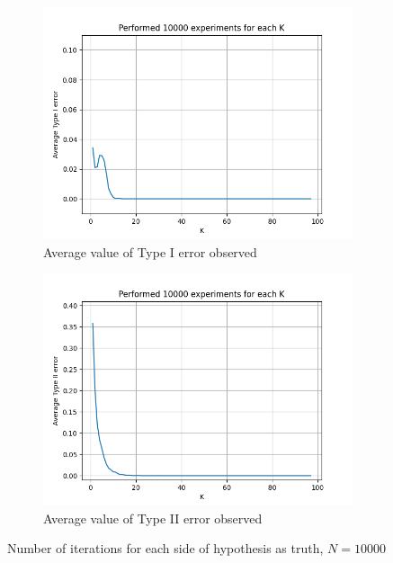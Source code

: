 \documentclass[fleqn, 11pt]{article}
\begin{document}
\newpage
\begin{figure}[H]
    \centering
    \begin{subfigure}[H]{0.49\textwidth}
        \centering
        \includegraphics[width=\textwidth]{P4/type1_10000.png}
        \caption[]{Average value of Type I error observed}
    \end{subfigure}
    \begin{subfigure}[H]{0.49\textwidth}
        \centering
        \includegraphics[width=\textwidth]{P4/type2_10000.png}
        \caption[]{Average value of Type II error observed}
    \end{subfigure}
    \caption{Number of iterations for each side of hypothesis as truth, $N = 10000$}
\end{figure}
\end{document}
